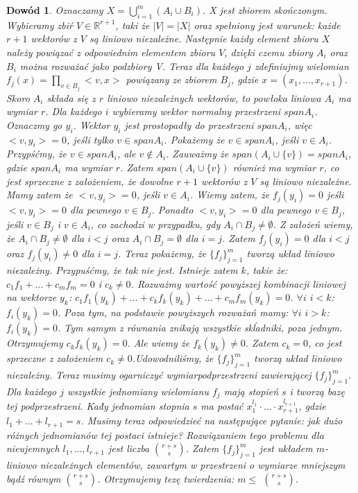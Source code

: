 \documentclass[12pt,a4paper]{article}
\newtheorem{dw}{Dow\'od}[section]
\begin{document}
\begin{dw}
Oznaczamy $X=\bigcup_{i=1}^{m} (A_i \cup B_{i})$. X jest zbiorem sko\'nczonym. Wybieramy zbi\'r $V\in\mathbb{R}^{r+1}$, taki \.ze $|V|=|X|$ oraz spe{\l}niony jest warunek: ka\.zde $r+1$ wektor\'ow z $V$ s\k{a} liniowo niezale\.zne. Nast\k{e}pnie ka\.zdy element zbioru $X$ nale\.zy powi\k{a}za\'c z odpowiednim elementem zbioru $V$, dzi\k{e}ki czemu zbiory $A_{i}$ oraz $B_{i}$ mo\.zna rozwa\.za\'c jako podzbiory V. Teraz dla ka\.zdego $j$ zdefiniujmy wielomian $f_{j}(x)=\prod_{v\in B_{j}}<v,x>$ powi\k{a}zany ze zbiorem $B_{j}$, gdzie $x=(x_{1},\ldots,x_{r+1})$. Skoro $A_{i}$ sk{\l}ada si\k{e} z $r$ liniowo niezale\.znych wektor\'ow, to pow{\l}oka liniowa $A_{i}$ ma wymiar $r$. Dla ka\.zdego $i$ wybieramy wektor normalny przestrzeni $spanA_{i}$. Oznaczmy go $y_{i}$. Wektor $y_{i}$ jest prostopad{\l}y do przestrzeni $spanA_{i}$, wi\k{e}c $<v,y_{i}>=0$, je\'sli tylko $v\in spanA_{i}$. Poka\.zemy \.ze $v\in spanA_{i}$, je\'sli $v\in A_{i}$. Przyp\'s\'cmy, \.ze $v\in spanA_{i}$, ale $v\notin A_{i}$. Zauwa\.zmy \.ze $span(A_{i}\cup\{v\})=spanA_{i}$, gdzie $spanA_{i}$ ma wymiar $r$. Zatem $span(A_{i}\cup\{v\})$ r\'ownie\.z ma wymiar $r$, co jest sprzeczne z za{\l}o\.zeniem, \.ze dowolne $r+1$ wektor\'ow z $V$ s\k{a} liniowo niezale\.zne. Mamy zatem \.ze $<v,y_{i}>=0$, je\'sli $v\in A_{i}$. Wiemy zatem, \.ze $f_j(y_{i})=0$ je\'sli $<v,y_{i}>=0$ dla pewnego $v\in B_{j}$. Ponadto $<v,y_{i}>=0$ dla pewnego $v\in B_{j}$, je\'sli $v\in B_{j}$ i $v\in A_{i}$, co zachodzi w przypadku, gdy $A_{i}\cap B_{j}\neq\emptyset$. Z za{\l}o\.ze\'n wiemy, \.ze $A_{i}\cap B_{j}\neq\emptyset$ dla $i<j$ oraz $A_{i}\cap B_{j}=\emptyset$ dla $i=j$. Zatem $f_{j}(y_{i})=0$ dla $i<j$ oraz $f_{j}(y_{i})\neq0$ dla $i=j$. Teraz poka\.zemy, \.ze $\{f_{j}\}_{j=1}^{m}$ tworz\k{a} uk{\l}ad liniowo niezale\.zny. Przypu\'s\'cmy, \.ze tak nie jest. Istnieje zatem $k$, takie \.ze: $c_{1}f_{1}+\ldots+c_{m}f_{m}=0$ i $c_{k}\neq0$. Rozwa\.zmy warto\'s\'c powy\.zszej kombinacji liniowej na wektorze $y_{k}$: $c_{1}f_{1}(y_{k})+\ldots+c_{k}f_{k}(y_{k})+\ldots+c_{m}f_{m}(y_{k})=0$. $\forall i$ $i<k$: $f_{i}(y_{k})=0$. Poza tym, na podstawie powy\.zszych rozwa\.za\'n mamy: $\forall i$ $i>k$: $f_{i}(y_{k})=0$. Tym samym z r\'ownania znikaj\k{a} wszystkie sk\'ladniki, poza jednym. Otrzymujemy $c_{k}f_{k}(y_{k})=0$. Ale wiemy \.ze $f_{k}(y_{k})\neq0$. Zatem $c_{k}=0$, co jest sprzeczne  z za{\l}o\.zeniem $c_{k}\neq0$.Udowodnili\'smy, \.ze $\{f_{j}\}_{j=1}^{m}$ tworz\k{a} uk{\l}ad liniowo niezale\.zny. Teraz musimy ogarniczy\'c wymiarpodprzestrzeni zawieraj\k{a}cej $\{f_{j}\}_{j=1}^{m}$. Dla ka\.zdego $j$ wszystkie jednomiany wielomianu $f_{j}$ maj\k{a} stopie\'n $s$ i tworz\k{a} baz\k{e} tej podprzestrzeni. Ka\.dy jednomian stopnia $s$ ma posta\'c $x_{1}^{l_{1}}\cdot\ldots\cdot x_{r+1}^{l_{r+1}}$, gdzie $l_{1}+\ldots+l_{r+1}=s$. Musimy teraz odpowiedzie\'c na nast\k{e}puj\k{a}ce pytanie: jak du\.zo r\'o\.znych jednomian\'ow tej postaci istnieje? Rozwi\k{a}zaniem tego problemu dla nieujemnych $l_{1},\ldots,l_{r+1}$ jest liczba ${r+s}\choose{s}$. Zatem $\{f_{j}\}_{j=1}^{m}$ jest uk{\l}adem $m$-liniowo niezale\.znych element\'ow, zawartym w przestrzeni o wymiarze mniejszym b\k{a}d\'z r\'ownym ${r+s}\choose{s}$. Otrzymujemy tez\k{e} twierdzenia: $m\leq$ ${r+s}\choose{s}$.

\end{dw}
\end{document}
